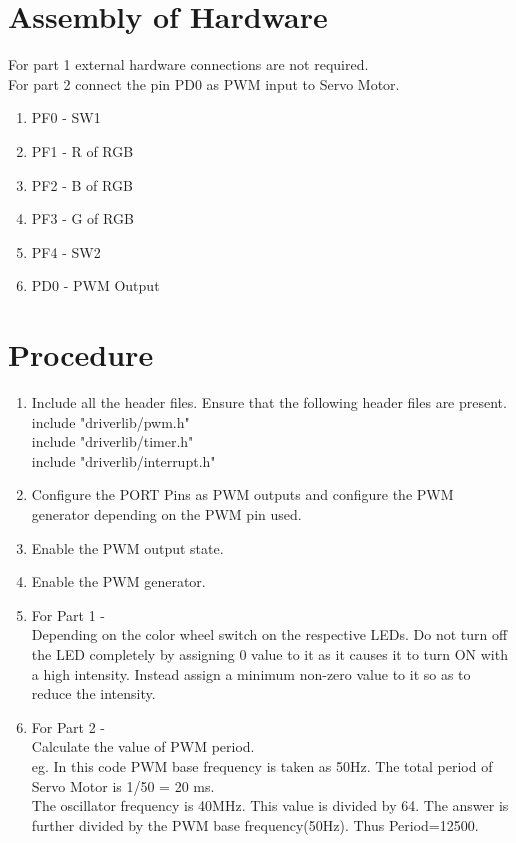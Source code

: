 \documentclass[a4paper,12pt,oneside]{book}
\begin{document}
\section{Assembly of Hardware}
For part 1 external hardware connections are not required.\\
For part 2 connect the pin PD0 as PWM input to Servo Motor.\\
\begin{enumerate}
\item PF0 - SW1
\item PF1 - R of RGB
\item PF2 - B of RGB
\item PF3 - G of RGB
\item PF4 - SW2
\item PD0 - PWM Output
\end{enumerate}

\section{Procedure}
\begin{enumerate}
\item Include all the header files. Ensure that the following header files are present.\\
 include "driverlib/pwm.h"\\
 include "driverlib/timer.h"\\
 include "driverlib/interrupt.h"
 \item Configure the PORT Pins as PWM outputs and configure the PWM generator depending on the PWM pin used.
 \item  Enable the PWM output state.
 \item  Enable the PWM generator. 
\item For Part 1 - \\Depending on the color wheel switch on the respective LEDs. Do not turn off the LED completely by assigning 0 value to it as it causes it to turn ON with a high intensity. Instead assign a minimum non-zero value to it so as to reduce the intensity.   

\item For Part 2 - \\Calculate the value of PWM period. \\
eg. In this code PWM base frequency is taken as 50Hz. The total period of Servo Motor is 1/50 = 20 ms. \\ 
The oscillator frequency is 40MHz. This value is divided by 64. The answer is further divided by the PWM base frequency(50Hz).
Thus Period=12500. 
\end{enumerate}
\end{document}
